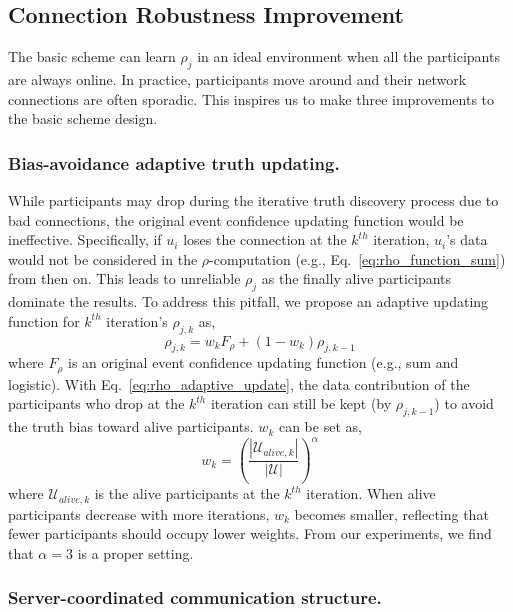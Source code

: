 \documentclass[11pt]{article}
\begin{document}
\subsection{Connection Robustness Improvement}

The basic scheme can learn $\rho_j$ in an ideal environment when all the participants are always online. In practice, participants move around and their network connections are often sporadic. This inspires us to make three improvements to the basic scheme design.

\subsubsection{Bias-avoidance adaptive truth updating.}
\label{sub:adaptive_truth_updating}
While participants may drop during the iterative truth discovery process due to bad connections, the original event confidence updating function would be ineffective. Specifically, if $u_i$ loses the connection at the $k^{th}$ iteration, $u_i$'s data would not be considered in the $\rho$-computation (e.g., Eq.~\ref{eq:rho_function_sum}) from then on. This leads to unreliable $\rho_j$ as the finally alive participants dominate the results. To address this pitfall, we propose an adaptive updating function for $k^{th}$ iteration's $\rho_{j,k}$ as,
\begin{equation}
	\rho_{j,k} = w_k F_\rho + (1-w_k) \rho_{j,k-1}
	\label{eq:rho_adaptive_update}
\end{equation}
where $F_\rho$ is an original event confidence updating function (e.g., sum and logistic). With Eq.~\ref{eq:rho_adaptive_update}, the data contribution of the participants who drop at the $k^{th}$ iteration can still be kept (by $\rho_{j,k-1}$) to avoid the truth bias toward alive participants. $w_k$ can be set as,
\begin{equation}
	w_k = (\frac{|\mathcal U_{alive,k}|}{|\mathcal U|})^\alpha
	\label{eq:adaptive_weight}
\end{equation}
where $\mathcal U_{alive,k}$ is the alive participants at the $k^{th}$ iteration. When alive participants decrease with more iterations, $w_k$ becomes smaller, reflecting that fewer participants should occupy lower weights. From our experiments, we find that $\alpha=3$ is a proper setting.

\subsubsection{Server-coordinated communication structure.}
\label{subsub:server_coordination}
\end{document}
